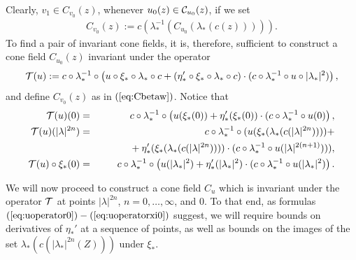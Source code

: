Clearly, $v_1 \in C_{v_0}(z)$, whenever $u_0(z) \in \mathcal{C}_{u_0}(z)$,  if we set 
\begin{eqnarray} \label{eq:Cbetaw}
C_{v_0}(z):=c\left(\lambda_*^{-1}\left(C_{u_0}(\lambda_*(c(z)))\right)\right).
\end{eqnarray}
To find a pair of invariant cone fields, it is, therefore, sufficient to construct a cone field $C_{u_0}(z)$ invariant under the operator
\begin{equation}\label{eq:uoperator}
\mathcal{T}(u):=c \circ \lambda_*^{-1} \circ \left(u \circ \xi_* \circ \lambda_* \circ c  +  (\eta'_* \circ \xi_* \circ \lambda_* \circ c ) \cdot (c \circ \lambda_*^{-1} \circ  u \circ |\lambda_*|^2) \right),
\end{equation}
and define $C_{v_0}(z)$ as in $(\ref{eq:Cbetaw})$. Notice that
\begin{eqnarray}
\label{eq:uoperator0} \cT(u)(0)&=&c \circ \lambda_*^{-1} \circ \left(u(\xi_*(0))  +  \eta'_*(\xi_*(0)) \cdot (c \circ \lambda_*^{-1} \circ  u(0) \right), \\
\label{eq:uoperator2n}\cT(u)(|\lambda|^{2n}) &=&c \circ \lambda_*^{-1} \circ(u(\xi_*(\lambda_*(c (|\lambda|^{2n}))))  +  \\
\nonumber &\phantom{=}& \phantom{c \circ \lambda_*^{-1}} + \eta'_*(\xi_*(\lambda_*(c(|\lambda|^{2n}) ))) \cdot (c \circ \lambda_*^{-1} \circ  u (|\lambda|^{2(n+1)}))),\\
\label{eq:uoperatorxi0} \cT(u)\circ \xi_*(0)&=&c \circ \lambda_*^{-1} \circ \left(u(|\lambda_*|^2) + \eta'_*(|\lambda_*|^2) \cdot (c \circ \lambda_*^{-1} \circ  u(|\lambda_*|^2) \right).
\end{eqnarray}

We will now proceed to construct a cone field $C_{u}$ which is invariant under the operator $\mathcal{T}$ at points $|\lambda|^{2n}$, $n=0, \ldots, \infty$, and $0$. To that end, as formulas $(\ref{eq:uoperator0})-(\ref{eq:uoperatorxi0})$ suggest,  we will require bounds on derivatives of $\eta_*'$ at a sequence of points, as well as bounds on the images of the set $\lambda_*(c(|\lambda_*|^{2n}(Z)))$ under $\xi_*$.


